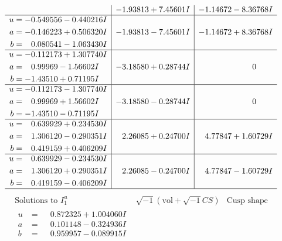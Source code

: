 \documentclass[1p]{elsarticle_modified}
\theoremstyle{definition}
\newcommand{\I}{\sqrt{-1}}
\begin{document}
$$\begin{array}{c|c|c}
 & -1.93813 + 7.45601 I & -1.14672 - 8.36768 I \\ \hline\begin{aligned}
u &= -0.549556 - 0.440216 I \\
a &= -0.146223 + 0.506320 I \\
b &= \phantom{-}0.080541 - 1.063430 I\end{aligned}
 & -1.93813 - 7.45601 I & -1.14672 + 8.36768 I \\ \hline\begin{aligned}
u &= -0.112173 + 1.307740 I \\
a &= \phantom{-}0.99969 - 1.56602 I \\
b &= -1.43510 + 0.71195 I\end{aligned}
 & -3.18580 + 0.28744 I & \phantom{-0.000000 } 0 \\ \hline\begin{aligned}
u &= -0.112173 - 1.307740 I \\
a &= \phantom{-}0.99969 + 1.56602 I \\
b &= -1.43510 - 0.71195 I\end{aligned}
 & -3.18580 - 0.28744 I & \phantom{-0.000000 } 0 \\ \hline\begin{aligned}
u &= \phantom{-}0.639929 + 0.234530 I \\
a &= \phantom{-}1.306120 - 0.290351 I \\
b &= \phantom{-}0.419159 + 0.406209 I\end{aligned}
 & \phantom{-}2.26085 + 0.24700 I & \phantom{-}4.77847 + 1.60729 I \\ \hline\begin{aligned}
u &= \phantom{-}0.639929 - 0.234530 I \\
a &= \phantom{-}1.306120 + 0.290351 I \\
b &= \phantom{-}0.419159 - 0.406209 I\end{aligned}
 & \phantom{-}2.26085 - 0.24700 I & \phantom{-}4.77847 - 1.60729 I\\
 \hline 
 \end{array}$$\newpage$$\begin{array}{c|c|c}  
\text{Solutions to }I^u_{1}& \I (\text{vol} + \sqrt{-1}CS) & \text{Cusp shape}\\
 \hline 
\begin{aligned}
u &= \phantom{-}0.872325 + 1.004060 I \\
a &= \phantom{-}0.101148 - 0.324936 I \\
b &= \phantom{-}0.959957 - 0.089915 I\end{aligned}

\end{array}$$
\end{document}
